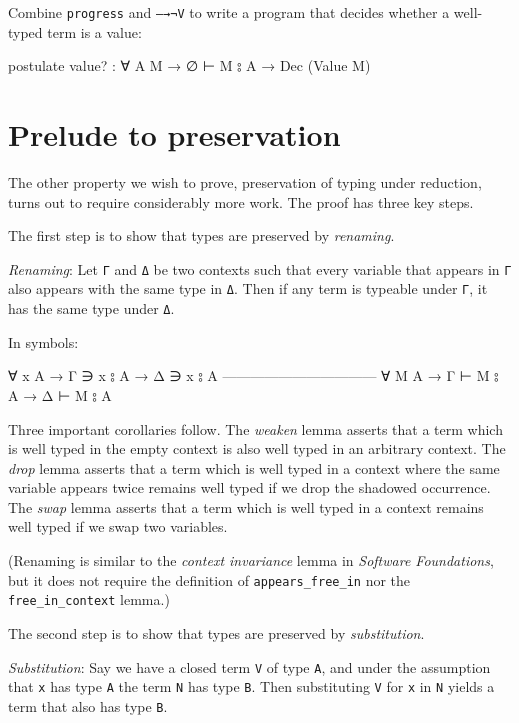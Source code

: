 Combine \texttt{progress} and \texttt{—→¬V} to write a program that
decides whether a well-typed term is a value:

\begin{fence}
\begin{code}
postulate
  value? : ∀ {A M} → ∅ ⊢ M ⦂ A → Dec (Value M)
\end{code}
\end{fence}

\hypertarget{prelude-to-preservation}{%
\section{Prelude to preservation}\label{prelude-to-preservation}}

The other property we wish to prove, preservation of typing under
reduction, turns out to require considerably more work. The proof has
three key steps.

The first step is to show that types are preserved by \emph{renaming}.

\emph{Renaming}: Let \texttt{Γ} and \texttt{Δ} be two contexts such that
every variable that appears in \texttt{Γ} also appears with the same
type in \texttt{Δ}. Then if any term is typeable under \texttt{Γ}, it
has the same type under \texttt{Δ}.

In symbols:

\begin{myDisplay}
∀ {x A} → Γ ∋ x ⦂ A  →  Δ ∋ x ⦂ A
---------------------------------
∀ {M A} → Γ ⊢ M ⦂ A  →  Δ ⊢ M ⦂ A
\end{myDisplay}

Three important corollaries follow. The \emph{weaken} lemma asserts that
a term which is well typed in the empty context is also well typed in an
arbitrary context. The \emph{drop} lemma asserts that a term which is
well typed in a context where the same variable appears twice remains
well typed if we drop the shadowed occurrence. The \emph{swap} lemma
asserts that a term which is well typed in a context remains well typed
if we swap two variables.

(Renaming is similar to the \emph{context invariance} lemma in
\emph{Software Foundations}, but it does not require the definition of
\texttt{appears\_free\_in} nor the \texttt{free\_in\_context} lemma.)

The second step is to show that types are preserved by
\emph{substitution}.

\emph{Substitution}: Say we have a closed term \texttt{V} of type
\texttt{A}, and under the assumption that \texttt{x} has type \texttt{A}
the term \texttt{N} has type \texttt{B}. Then substituting \texttt{V}
for \texttt{x} in \texttt{N} yields a term that also has type
\texttt{B}.


